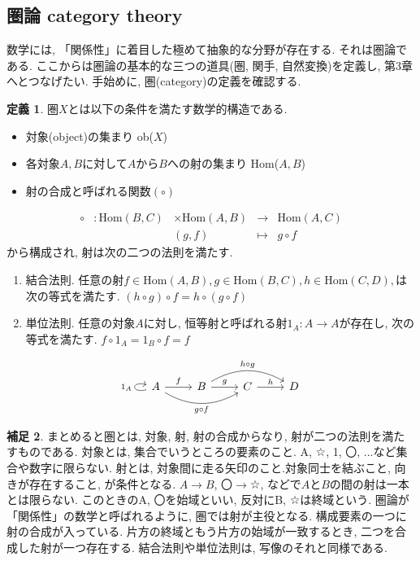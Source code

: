 \documentclass[a4paper]{jsarticle}
\theoremstyle{definition}
\newtheorem{dfn}{定義}[section]
\newtheorem{hsk}[dfn]{補足}
\newcommand{\Hom}{{\mathrm{Hom}}}
\begin{document}
\subsection{圏論 category theory}
数学には, 「関係性」に着目した極めて抽象的な分野が存在する. それは圏論である. ここからは圏論の基本的な三つの道具(圏, 関手, 自然変換)を定義し, 第3章へとつなげたい. 手始めに, 圏(category)の定義を確認する.
\begin{dfn}
圏$X$とは以下の条件を満たす数学的構造である. 
\begin{itemize}
    \item 対象(object)の集まり ob($X$)
    \item 各対象$A, B$に対して$A$から$B$への射の集まり Hom($A, B$)
    \item 射の合成と呼ばれる関数$(\circ)$
\end{itemize}
\begin{equation}
    \begin{array}{lllll}
     \circ &: \Hom (B, C) &\times \Hom (A, B) &\rightarrow &\Hom (A, C)  \\
         &    & (g,f) & \mapsto&  g\circ f
\end{array}
\end{equation}
から構成され, 射は次の二つの法則を満たす.
\begin{enumerate}[(1)]
    \item 結合法則. 任意の射$f\in \Hom(A,B), g\in \Hom(B,C), h\in \Hom(C,D),$は次の等式を満たす. $(h \circ g) \circ f = h \circ (g \circ f)$  
    \item 単位法則. 任意の対象$A$に対し, 恒等射と呼ばれる射$1_A:A\rightarrow A$が存在し, 次の等式を満たす.  $f\circ 1_A = 1_B\circ f = f$  
\end{enumerate}
\begin{equation}
    \begin{tikzcd}
    A\ar{r}{f} \ar[loop left,"1_A"] \ar[bend right=30,swap]{rr}{g\circ f}& B\ar{r}{g} \ar[bend left=30]{rr}{h\circ g}& C\ar{r}{h} & D
\end{tikzcd}
\end{equation}
\end{dfn}

\begin{hsk}
まとめると圏とは, 対象, 射, 射の合成からなり, 射が二つの法則を満たすものである.
対象とは, 集合でいうところの要素のこと. A, ☆, 1, 〇, ...など集合や数字に限らない.
射とは, 対象間に走る矢印のこと.対象同士を結ぶこと, 向きが存在すること, が条件となる. $A \rightarrow B$, 〇$\rightarrow$☆, などで$A$と$B$の間の射は一本とは限らない. このときのA, 〇を始域といい, 反対にB, ☆は終域という. 圏論が「関係性」の数学と呼ばれるように, 圏では射が主役となる. 構成要素の一つに射の合成が入っている. 片方の終域ともう片方の始域が一致するとき, 二つを合成した射が一つ存在する. 結合法則や単位法則は, 写像のそれと同様である. 
\\
\end{hsk}
\end{document}
